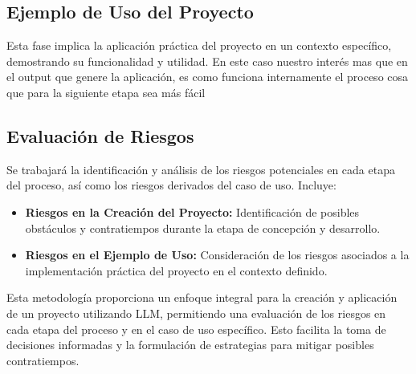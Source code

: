 \subsection{Ejemplo de Uso del Proyecto}

Esta fase implica la aplicación práctica del proyecto en un contexto específico, demostrando su funcionalidad y utilidad. 
En este caso nuestro interés mas que en el output que genere la aplicación, es como funciona internamente el proceso cosa 
que para la siguiente etapa sea más fácil 

\subsection{Evaluación de Riesgos}

Se trabajará la identificación y análisis de los riesgos potenciales en cada etapa del proceso, así como los riesgos derivados
del caso de uso. Incluye:

\begin{itemize}
    \item \textbf{Riesgos en la Creación del Proyecto:} Identificación de posibles obstáculos y contratiempos durante la etapa de concepción y desarrollo.
    \item \textbf{Riesgos en el Ejemplo de Uso:} Consideración de los riesgos asociados a la implementación práctica del proyecto en el contexto definido.
\end{itemize}

Esta metodología proporciona un enfoque integral para la creación y aplicación de un proyecto utilizando LLM, permitiendo una evaluación de los riesgos en cada etapa del proceso y en el caso de uso específico. Esto facilita la toma de decisiones informadas y la formulación de estrategias para mitigar posibles contratiempos.










